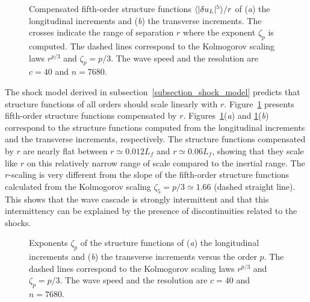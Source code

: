 \begin{figure}
\caption{
Compensated fifth-order structure functions $\langle |\delta u_L|^5 \rangle/r$ 
of (\textit{a}) the longitudinal increments and (\textit{b}) the
transverse increments. %
The crosses indicate the range of separation $r$ where the exponent
$\zeta_p$ is computed. %
The dashed lines correspond to the Kolmogorov scaling laws $r^{p/3}$
and $\zeta_p = p/3$.  The wave speed and the resolution are $c = 40$
and $n = 7680$.  }
\label{fig_strfct5}
\end{figure}


The shock model derived in subsection~\ref{subsection_shock_model}
predicts that structure functions of all orders should scale linearly
with $r$.
%
Figure~\ref{fig_strfct5} presents fifth-order structure functions
compensated by $r$.
%
Figures~\ref{fig_strfct5}(\textit{a}) and
\ref{fig_strfct5}(\textit{b}) correspond to the structure functions
computed from the longitudinal increments and the transverse
increments, respectively.  The structure functions compensated by $r$
are nearly flat between $r \simeq 0.012 L_f$ and $r \simeq 0.06 L_f$,
showing that they scale like $r$ on this relatively narrow range of
scale compared to the inertial range.
%
The $r$-scaling is very different from the slope of the fifth-order
structure functions calculated from the Kolmogorov scaling $\zeta_5 =
p/3 \simeq 1.66$ (dashed straight line).  This shows that the wave
cascade is strongly intermittent and that this intermittency can be
explained by the presence of discontinuities related to the shocks.




\begin{figure}
\caption{
Exponents $\zeta_p$ of the structure functions 
of (\textit{a}) the longitudinal increments 
and (\textit{b}) the transverse increments versus the order $p$.
%
The dashed lines correspond to 
the Kolmogorov scaling laws $r^{p/3}$ and $\zeta_p = p/3$.
The wave speed and the resolution are $c = 40$ and $n = 7680$.
}
\label{fig_interm}
\end{figure}






